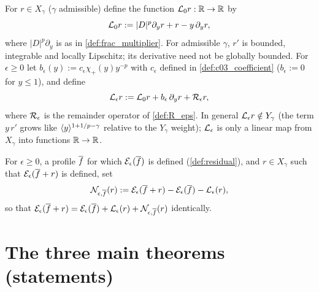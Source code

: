 \begin{definition}
  \label{def:L_eps}
  For $r\in X_\gamma$ ($\gamma$ admissible) define the function $\mathcal{L}_0 r:\mathbb{R}\to\mathbb{R}$ by
  \[
    \mathcal{L}_0r:=|D|^p\partial_yr+r-y\,\partial_yr,
  \]
  where $|D|^p\partial_y$ is as in \cref{def:frac_multiplier}. For admissible $\gamma$, $r'$ is bounded,
  integrable and locally Lipschitz; its derivative need not be globally bounded. For $\epsilon\ge0$ let
  $b_\epsilon(y):=c_\epsilon\chi_+(y)y^{-p}$ with $c_\epsilon$ defined in \cref{def:c03_coefficient}
  ($b_\epsilon:=0$ for $y\le1$), and define
  \[
    \mathcal{L}_\epsilon r:=\mathcal{L}_0r+b_\epsilon\,\partial_yr+\mathcal{R}_\epsilon r,
  \]
  where $\mathcal{R}_\epsilon$ is the remainder operator of \cref{def:R_eps}. In general
  $\mathcal{L}_\epsilon r\notin Y_\gamma$ (the term $y\,r'$ grows like $\langle y \rangle^{1+1/p-\gamma}$ relative to the $Y_\gamma$ weight);
  $\mathcal{L}_\epsilon$ is only a linear map from $X_\gamma$ into functions $\mathbb{R}\to\mathbb{R}$.
\end{definition}

\begin{definition}
  \label{def:N_eps}
  For $\epsilon\ge0$, a profile $\overline{f}$ for which $\mathcal{E}_\epsilon(\overline{f})$ is defined (\cref{def:residual}), and $r\in X_\gamma$
  such that $\mathcal{E}_\epsilon(\overline{f}+r)$ is defined, set
  \[
    \mathcal{N}_{\epsilon,\overline{f}}(r):=\mathcal{E}_\epsilon(\overline{f}+r)-\mathcal{E}_\epsilon(\overline{f})-\mathcal{L}_\epsilon(r),
  \]
  so that $\mathcal{E}_\epsilon(\overline{f}+r)=\mathcal{E}_\epsilon(\overline{f})+\mathcal{L}_\epsilon(r)+\mathcal{N}_{\epsilon,\overline{f}}(r)$ identically.
\end{definition}

\section{The three main theorems (statements)}

